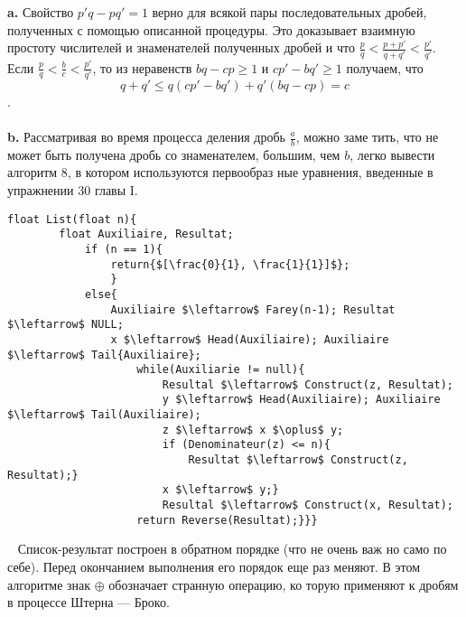 \textbf{a.}  Свойство $p'q - pq' = 1$ верно для всякой пары последовательных\linebreak
дробей, полученных с помощью описанной процедуры. Это доказывает\linebreak
взаимную простоту числителей и знаменателей полученных дробей и\linebreak
что $\frac{p}{q} < \frac{p + p'}{q + q'} < \frac{p'}{q'}$.\\

\hspace*{0pt}Если $\frac{p}{q} < \frac{b}{c} < \frac{p'}{q'}$, то из неравенств $bq - cp \geq 1$ и $cp' - bq' \geq 1$ получаем,\linebreak
что
$$q + q' \leq q(cp' - bq') + q'(bq - cp) = c$$.\\
\\
\hspace*{15pt}\textbf{b.} Рассматривая во время процесса деления дробь $\frac{a}{b}$, можно заме­\linebreak
тить, что не может быть получена дробь со знаменателем, большим,\linebreak
чем $b$,  легко вывести алгоритм 8, в котором используются первообраз­\linebreak
ные уравнения, введенные в упражнении 30 главы I.\\

\begin{lstlisting}[mathescape = true, caption = {Прохождение ряда Фарея}]
	float List(float n){
		float Auxiliaire, Resultat;
			if (n == 1){
				return{$[\frac{0}{1}, \frac{1}{1}]$};
				}
			else{
				Auxiliaire $\leftarrow$ Farey(n-1); Resultat $\leftarrow$ NULL;
				x $\leftarrow$ Head(Auxiliaire); Auxiliaire $\leftarrow$ Tail{Auxiliaire};
					while(Auxiliarie != null){
						Resultal $\leftarrow$ Construct(z, Resultat);
						у $\leftarrow$ Head(Auxiliaire); Auxiliaire $\leftarrow$ Tail(Auxiliaire);
						z $\leftarrow$ x $\oplus$ y;
						if (Denominateur(z) <= n){
							Resultat $\leftarrow$ Construct(z, Resultat);}
						x $\leftarrow$ y;}
						Resultal $\leftarrow$ Construct(x, Resultat);
					return Reverse(Resultat);}}}
			\end{lstlisting}
	\ \newline
\hspace*{15pt} Список-результат построен в обратном порядке (что не очень важ­\linebreak
но само по себе). Перед окончанием выполнения его порядок еще раз\linebreak 
меняют. В этом алгоритме знак $\oplus$  обозначает странную операцию, ко­\linebreak
торую применяют к дробям в процессе Штерна — Броко.

